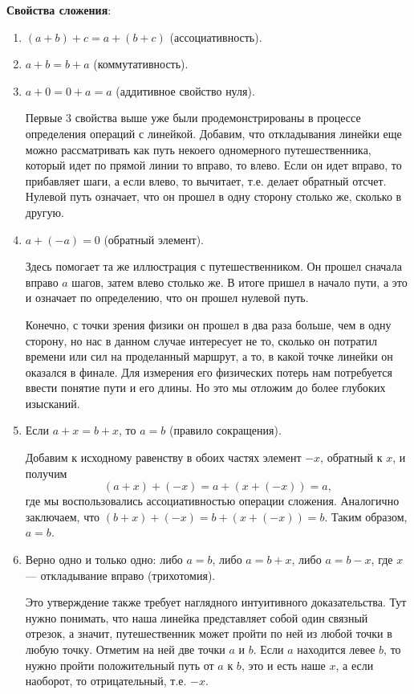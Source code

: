 \textbf{Свойства сложения}:
\begin{enumerate}[label=S\arabic*]
\item $(a+b)+c=a+(b+c)$ (ассоциативность).
\item $a+b=b+a$ (коммутативность).
\item $a+0=0+a=a$ (аддитивное свойство нуля).

Первые 3 свойства выше уже были продемонстрированы в процессе определения операций с линейкой. Добавим, что откладывания линейки еще можно рассматривать как путь некоего одномерного путешественника, который идет по прямой линии то вправо, то влево. Если он идет вправо, то прибавляет шаги, а если влево, то вычитает, т.е. делает обратный отсчет. Нулевой путь означает, что он прошел в одну сторону столько же, сколько в другую.

\item $a+(-a)=0$ (обратный элемент).

Здесь помогает та же иллюстрация с путешественником. Он прошел сначала вправо $a$ шагов, затем влево столько же. В итоге пришел в начало пути, а это и означает по определению, что он прошел нулевой путь.

Конечно, с точки зрения физики он прошел в два раза больше, чем в одну сторону, но нас в данном случае интересует не то, сколько он потратил времени или сил на проделанный маршрут, а то, в какой точке линейки он оказался в финале. Для измерения его физических потерь нам потребуется ввести понятие пути и его длины. Но это мы отложим до более глубоких изысканий.

\item Если $a+x=b+x$, то $a=b$ (правило сокращения).

Добавим к исходному равенству в обоих частях элемент $-x$, обратный к $x$, и получим
$$
(a+x)+(-x) = a+(x+(-x)) = a,
$$
где мы воспользовались ассоциативностью операции сложения. Аналогично заключаем, что $(b+x)+(-x) = b+(x+(-x)) = b$. Таким образом, $a=b$.

\item Верно одно и только одно: либо $a=b$, либо $a=b+x$, либо $a=b-x$, где $x$ --- откладывание вправо (трихотомия).

Это утверждение также требует наглядного интуитивного доказательства. Тут нужно понимать, что наша линейка представляет собой один связный отрезок, а значит, путешественник может пройти по ней из любой точки в любую точку. Отметим на ней две точки $a$ и $b$. Если $a$ находится левее $b$, то нужно пройти положительный путь от $a$ к $b$, это и есть наше $x$, а если наоборот, то отрицательный, т.е. $-x$.
\end{enumerate}

